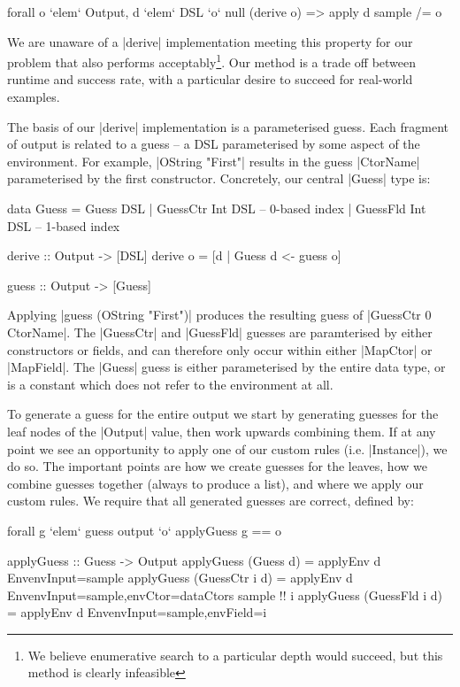 \documentclass[preprint,draft]{sigplanconf}
\begin{document}
\ignore\begin{code}
forall o `elem` Output, d `elem` DSL `o` null (derive o) => apply d sample /= o
\end{code}

We are unaware of a |derive| implementation meeting this property for our problem that also performs acceptably\footnote{We believe enumerative search to a particular depth would succeed, but this method is clearly infeasible}. Our method is a trade off between runtime and success rate, with a particular desire to succeed for real-world examples.

The basis of our |derive| implementation is a parameterised guess. Each fragment of output is related to a guess -- a DSL parameterised by some aspect of the environment. For example, |OString "First"| results in the guess |CtorName| parameterised by the first constructor. Concretely, our central |Guess| type is:

\begin{code}
data Guess  =  Guess DSL
            |  GuessCtr Int DSL -- 0-based index
            |  GuessFld Int DSL -- 1-based index

derive :: Output -> [DSL]
derive o = [d | Guess d <- guess o]

guess :: Output -> [Guess]
\end{code}

Applying |guess (OString "First")| produces the resulting guess of |GuessCtr 0 CtorName|. The |GuessCtr| and |GuessFld| guesses are paramterised by either constructors or fields, and can therefore only occur within either |MapCtor| or |MapField|. The |Guess| guess is either parameterised by the entire data type, or is a constant which does not refer to the environment at all.

To generate a guess for the entire output we start by generating guesses for the leaf nodes of the |Output| value, then work upwards combining them. If at any point we see an opportunity to apply one of our custom rules (i.e. |Instance|), we do so. The important points are how we create guesses for the leaves, how we combine guesses together (always to produce a list), and where we apply our custom rules. We require that all generated guesses are correct, defined by:

\ignore\begin{code}
forall g `elem` guess output `o` applyGuess g == o
\end{code}
\begin{code}
applyGuess :: Guess -> Output
applyGuess (Guess       d) = applyEnv d
    Env{envInput=sample}
applyGuess (GuessCtr i  d) = applyEnv d 
    Env{envInput=sample,envCtor=dataCtors sample !! i}
applyGuess (GuessFld i  d) = applyEnv d
    Env{envInput=sample,envField=i}
\end{code}
\end{document}
